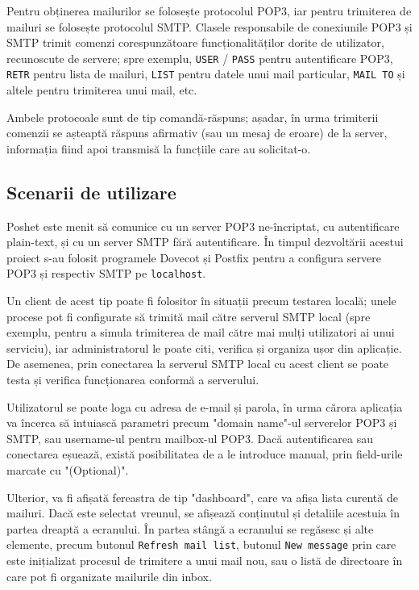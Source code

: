 \documentclass[runningheads]{llncs}
\begin{document}
Pentru obținerea mailurilor se folosește protocolul POP3\cite{ref_rfc_pop3}, iar pentru trimiterea de mailuri se folosește protocolul SMTP\cite{ref_rfc_smtp}. Clasele responsabile de conexiunile POP3 și SMTP trimit comenzi corespunzătoare funcționalităților dorite de utilizator, recunoscute de servere; spre exemplu, \texttt{USER} / \texttt{PASS} pentru autentificare POP3, \texttt{RETR} pentru lista de mailuri, \texttt{LIST} pentru datele unui mail particular, \texttt{MAIL TO} și altele pentru trimiterea unui mail, etc.

Ambele protocoale sunt de tip comandă-răspuns; așadar, în urma trimiterii comenzii se așteaptă răspuns afirmativ (sau un mesaj de eroare) de la server, informația fiind apoi transmisă la funcțiile care au solicitat-o.

\subsection{Scenarii de utilizare}
Poshet este menit să comunice cu un server POP3 ne-încriptat, cu autentificare plain-text, și cu un server SMTP fără autentificare. În timpul dezvoltării acestui proiect s-au folosit programele Dovecot și Postfix pentru a configura servere POP3 și respectiv SMTP pe \texttt{localhost}.

Un client de acest tip poate fi folositor în situații precum testarea locală; unele procese pot fi configurate să trimită mail către serverul SMTP local (spre exemplu, pentru a simula trimiterea de mail către mai mulți utilizatori ai unui serviciu), iar administratorul le poate citi, verifica și organiza ușor din aplicație. De asemenea, prin conectarea la serverul SMTP local cu acest client se poate testa și verifica funcționarea conformă a serverului.

Utilizatorul se poate loga cu adresa de e-mail și parola, în urma cărora aplicația va încerca să intuiască parametri precum "domain name"-ul serverelor POP3 și SMTP, sau username-ul pentru mailbox-ul POP3. Dacă autentificarea sau conectarea eșuează, există posibilitatea de a le introduce manual, prin field-urile marcate cu "(Optional)".

Ulterior, va fi afișată fereastra de tip "dashboard", care va afișa lista curentă de mailuri. Dacă este selectat vreunul, se afișează conținutul și detaliile acestuia în partea dreaptă a ecranului. În partea stângă a ecranului se regăsesc și alte elemente, precum butonul \texttt{Refresh mail list}, butonul \texttt{New message} prin care este inițializat procesul de trimitere a unui mail nou, sau o listă de directoare în care pot fi organizate mailurile din inbox.
\end{document}
